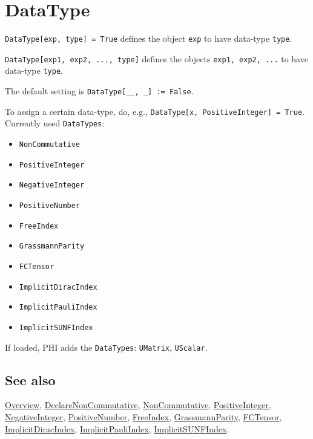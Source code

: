 \documentclass[../FeynCalcManual.tex]{subfiles}
\begin{document}
\hypertarget{datatype}{
\section{DataType}\label{datatype}}

\texttt{DataType[\allowbreak{}exp,\ \allowbreak{}type] = True} defines
the object \texttt{exp} to have data-type \texttt{type}.

\texttt{DataType[\allowbreak{}exp1,\ \allowbreak{}exp2,\ \allowbreak{}...,\ \allowbreak{}type]}
defines the objects \texttt{exp1,\ \allowbreak{}exp2,\ \allowbreak{}...}
to have data-type \texttt{type}.

The default setting is
\texttt{DataType[\allowbreak{}__,\ \allowbreak{}_] := False}.

To assign a certain data-type, do, e.g.,
\texttt{DataType[\allowbreak{}x,\ \allowbreak{}PositiveInteger] = True}.
Currently used \texttt{DataTypes}:

\begin{itemize}
\item
  \texttt{NonCommutative}
\item
  \texttt{PositiveInteger}
\item
  \texttt{NegativeInteger}
\item
  \texttt{PositiveNumber}
\item
  \texttt{FreeIndex}
\item
  \texttt{GrassmannParity}
\item
  \texttt{FCTensor}
\item
  \texttt{ImplicitDiracIndex}
\item
  \texttt{ImplicitPauliIndex}
\item
  \texttt{ImplicitSUNFIndex}
\end{itemize}

If loaded, PHI adds the \texttt{DataTypes}: \texttt{UMatrix},
\texttt{UScalar}.

\subsection{See also}

\hyperlink{toc}{Overview},
\hyperlink{declarenoncommutative}{DeclareNonCommutative},
\hyperlink{noncommutative}{NonCommutative},
\hyperlink{positiveinteger}{PositiveInteger},
\hyperlink{negativeinteger}{NegativeInteger},
\hyperlink{positivenumber}{PositiveNumber},
\hyperlink{freeindex}{FreeIndex},
\hyperlink{grassmannparity}{GrassmannParity},
\hyperlink{fctensor}{FCTensor},
\hyperlink{implicitdiracindex}{ImplicitDiracIndex},
\hyperlink{implicitpauliindex}{ImplicitPauliIndex},
\hyperlink{implicitsunfindex}{ImplicitSUNFIndex}.
\end{document}
